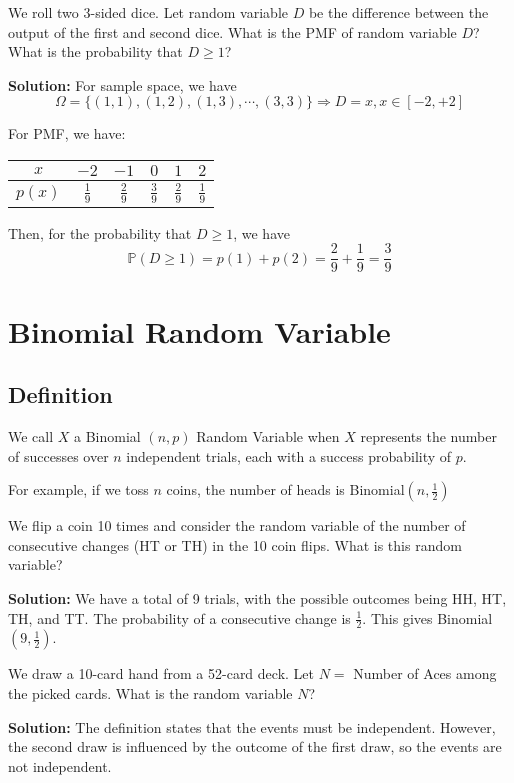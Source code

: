 \begin{eg}
We roll two 3-sided dice. Let random variable \(D\) be the difference between the output of the first and second dice. What is the PMF of random variable \(D\)? What is the probability that \(D \geq 1\)?

\textbf{Solution:} 
For sample space, we have
\[
  \Omega = \{(1, 1), (1, 2), (1, 3), \cdots, (3, 3)\} \Longrightarrow D = x, x \in [-2, +2]
\]
\newpage

For PMF, we have:
\begin{table}[H]
  \centering
  \begin{tabular}{c|c|c|c|c|c}
      \(x\)  & \(-2\) & \(-1\) & \(0\) & \(1\) & \(2\)  \\
    \midrule
      \(p(x)\)  & \(\frac{1}{9}\) & \(\frac{2}{9}\) & \(\frac{3}{9}\) & \(\frac{2}{9}\) & \(\frac{1}{9}\)
  \end{tabular}
\end{table}

Then, for the probability that \(D \geq 1\), we have 
\[
  \mathbb{P}(D \geq 1) = p(1) + p(2) = \dfrac{2}{9} + \dfrac{1}{9} = \dfrac{3}{9}
\]
\end{eg}

\section{Binomial Random Variable}
\subsection{Definition}
We call \(X\) a Binomial \((n, p)\) Random Variable when \(X\) represents the number of successes over \(n\) independent trials, each with a success probability of \(p\).

For example, if we toss \(n\) coins, the number of heads is Binomial\((n,\frac{1}{2})\) 

\begin{eg}
We flip a coin 10 times and consider the random variable of the number of consecutive changes (HT or TH) in the 10 coin flips. What is this random variable?

\textbf{Solution:} 
We have a total of 9 trials, with the possible outcomes being HH, HT, TH, and TT. The probability of a consecutive change is \(\frac{1}{2}\). This gives Binomial\((9, \frac{1}{2})\). 
\end{eg}

\begin{eg}
  We draw a 10-card hand from a 52-card deck. Let \(N =\) Number of Aces among the picked cards. What is the random variable \(N\)?
  
  \textbf{Solution:} 
  The definition states that the events must be independent. However, the second draw is influenced by the outcome of the first draw, so the events are not independent.
\end{eg}

